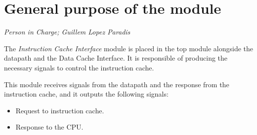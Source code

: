 \newpage
\section{General purpose of the module}
\textit{Person in Charge; Guillem Lopez Paradis}

The \textit{Instruction Cache Interface} module is placed in the top module alongside the datapath and the Data Cache Interface.
It is responsible of producing the necessary signals to control the instruction cache.

This module receives signals from the datapath and the response from the instruction cache, and it outputs the following signals:

\begin{itemize}
    \item Request to instruction cache.
    \item Response to the CPU.
\end{itemize}
